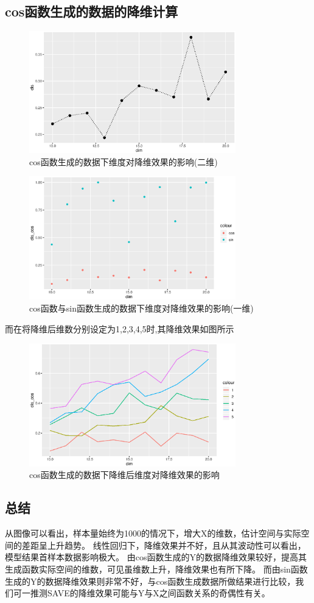 \subsection{cos函数生成的数据的降维计算}
\begin{figure}[H]
    \centering
    \includegraphics[width=0.8\textwidth]{image/cos_save.eps}
    \caption{cos函数生成的数据下维度对降维效果的影响(二维)}
\end{figure}

\begin{figure}[H]
    \centering
    \includegraphics[width=0.8\textwidth]{image/compare_save_one.eps}
    \caption{cos函数与sin函数生成的数据下维度对降维效果的影响(一维)}
\end{figure}

而在将降维后维数分别设定为1,2,3,4,5时,其降维效果如图所示
\begin{figure}[H]
    \centering
    \includegraphics[width=0.8\textwidth]{image/compare_dim_save.eps}
    \caption{cos函数生成的数据下降维后维度对降维效果的影响}
\end{figure}

\subsection{总结}
从图像可以看出，样本量始终为1000的情况下，增大X的维数，估计空间与实际空间的差距呈上升趋势。
线性回归下，降维效果并不好，且从其波动性可以看出，模型结果首样本数据影响极大。
由cos函数生成的Y的数据降维效果较好，提高其生成函数实际空间的维数，可见虽维数上升，降维效果也有所下降。
而由sin函数生成的Y的数据降维效果则非常不好，与cos函数生成数据所做结果进行比较，我们可一推测SAVE的降维效果可能与Y与X之间函数关系的奇偶性有关。